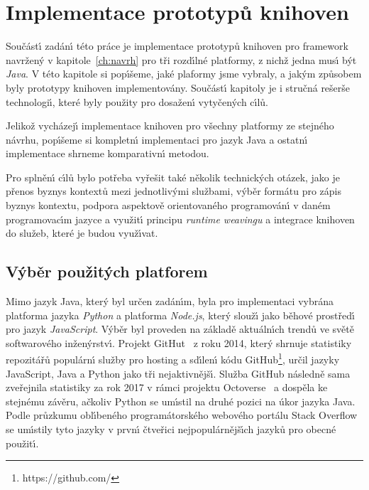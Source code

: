 

\chapter{Implementace prototypů knihoven}\label{ch:implementace}

Součást\'{\i} zadán\'{\i} této práce je implementace prototypů
knihoven pro framework navržen\'y v kapitole~\ref{ch:navrh}
pro tři rozd\'{\i}lné platformy, z nichž jedna mus\'{\i} b\'yt \textit{Java}.
V této kapitole si pop\'{\i}šeme, jaké plaformy jsme vybraly, a jak\'ym
způsobem byly prototypy knihoven implementovány. Součást\'{\i}
kapitoly je i stručná rešerše technologi\'{\i}, které byly použity
pro dosažen\'{\i} vytyčen\'ych c\'{\i}lů.

Jelikož vycházej\'{\i} implementace knihoven pro všechny platformy
ze stejného návrhu, pop\'{\i}šeme si kompletn\'{\i} implementaci pro jazyk
Java a ostatn\'{\i} implementace shrneme komparativn\'{\i} metodou.

Pro splněn\'{\i} c\'{\i}lů bylo potřeba vyřešit také několik technick\'ych otázek,
jako je přenos byznys kontextů mezi jednotliv\'ymi službami, v\'yběr formátu
pro zápis byznys kontextu, podpora aspektově orientovaného programován\'{\i}
v daném programovac\'{\i}m jazyce a využit\'{\i} principu \textit{runtime weavingu}
a integrace knihoven do služeb, které je budou využ\'{\i}vat.

\section{V\'yběr použit\'ych platforem}

Mimo jazyk Java, kter\'y byl určen zadán\'{\i}m, byla pro
implementaci vybrána platforma jazyka \textit{Python}
a platforma \textit{Node.js}, kter\'y slouž\'{\i} jako
běhové prostřed\'{\i} pro jazyk \textit{JavaScript}.
V\'yběr byl proveden na základě aktuáln\'{\i}ch trendů
ve světě softwarového inžen\'yrstv\'{\i}. Projekt GitHut~\cite{githut}
z roku 2014, kter\'y shrnuje statistiky repozitářů
populárn\'{\i} služby pro hosting a sd\'{\i}len\'{\i} kódu
GitHub\footnote{https://github.com/}, určil
jazyky JavaScript, Java a Python jako tři nejaktivnějš\'{\i}.
Služba GitHub následně sama zveřejnila statistiky za rok 2017
v rámci projektu Octoverse~\cite{octoverse}
a dospěla ke stejnému závěru, ačkoliv Python se um\'{\i}stil na druhé
pozici na úkor jazyka Java. Podle průzkumu obl\'{\i}beného
programátorského webového portálu Stack
Overflow~\cite{stackoverflowsurvey} se um\'{\i}stily tyto jazyky
v prvn\'{\i} čtveřici nejpopulárnějš\'{\i}ch jazyků pro obecné použit\'{\i}.

